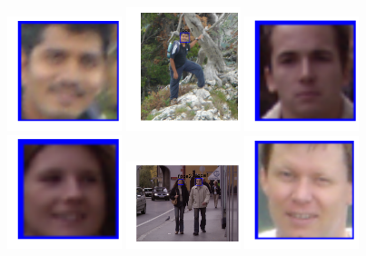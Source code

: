 \includegraphics[width=0.25\textwidth]{facedetection_files/facedetection_59_0.png}
\includegraphics[width=0.25\textwidth]{facedetection_files/facedetection_59_1.png}
\includegraphics[width=0.25\textwidth]{facedetection_files/facedetection_59_2.png}
\includegraphics[width=0.25\textwidth]{facedetection_files/facedetection_59_3.png}
\includegraphics[width=0.25\textwidth]{facedetection_files/facedetection_59_4.png}
\includegraphics[width=0.25\textwidth]{facedetection_files/facedetection_59_5.png}
